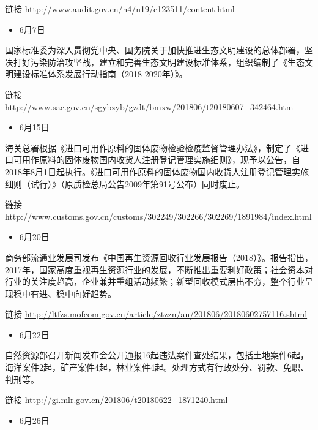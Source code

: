 \documentclass[]{book}
\providecommand{\tightlist}{%
  \setlength{\itemsep}{0pt}\setlength{\parskip}{0pt}}
\begin{document}
链接 \url{http://www.audit.gov.cn/n4/n19/c123511/content.html}

\begin{itemize}
\tightlist
\item
  6月7日
\end{itemize}

国家标准委为深入贯彻党中央、国务院关于加快推进生态文明建设的总体部署，坚决打好污染防治攻坚战，建立和完善生态文明建设标准体系，组织编制了《生态文明建设标准体系发展行动指南（2018-2020年）》。

链接 \url{http://www.sac.gov.cn/sgybzyb/gzdt/bmxw/201806/t20180607_342464.htm}

\begin{itemize}
\tightlist
\item
  6月15日
\end{itemize}

海关总署根据《进口可用作原料的固体废物检验检疫监督管理办法》，制定了《进口可用作原料的固体废物国内收货人注册登记管理实施细则》，现予以公告，自2018年8月1日起执行。《进口可用作原料的固体废物国内收货人注册登记管理实施细则（试行）》（原质检总局公告2009年第91号公布）同时废止。

链接 \url{http://www.customs.gov.cn/customs/302249/302266/302269/1891984/index.html}

\begin{itemize}
\tightlist
\item
  6月20日
\end{itemize}

商务部流通业发展司发布《中国再生资源回收行业发展报告（2018）》。报告指出，2017年，国家高度重视再生资源行业的发展，不断推出重要利好政策；社会资本对行业的关注度趋高，企业兼并重组活动频繁；新型回收模式层出不穷，整个行业呈现稳中有进、稳中向好趋势。

链接 \url{http://ltfzs.mofcom.gov.cn/article/ztzzn/an/201806/20180602757116.shtml}

\begin{itemize}
\tightlist
\item
  6月22日
\end{itemize}

自然资源部召开新闻发布会公开通报16起违法案件查处结果，包括土地案件6起，海洋案件2起，矿产案件4起，林业案件4起。处理方式有行政处分、罚款、免职、判刑等。

链接 \url{http://gi.mlr.gov.cn/201806/t20180622_1871240.html}

\begin{itemize}
\tightlist
\item
  6月26日
\end{itemize}
\end{document}
